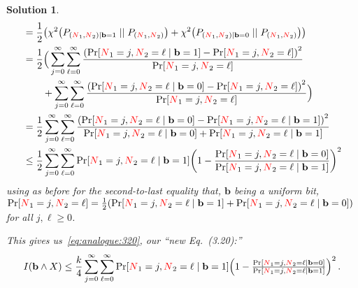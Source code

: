 \documentclass[biber,plain]{nowfnt} %
\newtheorem{solution}{Solution}[chapter]
\newcommand{\occur}{\textcolor{red}{N}}
\newcommand{\occur}{N}
\begin{document}
\begin{solution}
\begin{align*}
	&= \frac{1}{2}\Paren{\chisquare{P_{(\occur_1,\occur_2)\mid \mathbf{b}=\accept}}{P_{(\occur_1,\occur_2)}} + \chisquare{P_{(\occur_1,\occur_2)\mid \mathbf{b}=\reject}}{P_{(\occur_1,\occur_2)}}}\notag\\
	&= \frac{1}{2}\Big(\sum_{j=0}^\infty\sum_{\ell=0}^\infty \frac{\Paren{\bPr{\occur_1=j, \occur_2 = \ell\mid \mathbf{b}=\accept }-\bPr{\occur_1=j, \occur_2 = \ell }}^2}{\bPr{\occur_1=j, \occur_2 = \ell}}  \notag\\
	&\qquad+ \sum_{j=0}^\infty\sum_{\ell=0}^\infty \frac{\Paren{\bPr{\occur_1=j, \occur_2 = \ell\mid \mathbf{b}=\reject }-\bPr{\occur_1=j, \occur_2 = \ell }}^2}{\bPr{\occur_1=j, \occur_2 = \ell}} \Big) \notag\\
	&=\frac{1}{2} \sum_{j=0}^\infty\sum_{\ell=0}^\infty \frac{\Paren{\bPr{\occur_1=j, \occur_2 = \ell\mid \mathbf{b}=\reject }-\bPr{\occur_1=j, \occur_2 = \ell\mid \mathbf{b}=\accept }}^2}{\bPr{\occur_1=j, \occur_2 = \ell\mid \mathbf{b}=\reject }+\bPr{\occur_1=j, \occur_2 = \ell\mid \mathbf{b}=\accept }} \notag\\
	&\leq \frac{1}{2} \sum_{j=0}^\infty\sum_{\ell=0}^\infty \bPr{\occur_1=j, \occur_2 = \ell\mid \mathbf{b}=\accept }\Paren{1-  \frac{\bPr{\occur_1=j, \occur_2 = \ell\mid \mathbf{b}=\reject }}{\bPr{\occur_1=j, \occur_2 = \ell\mid \mathbf{b}=\accept }}  }^2
\end{align*}
using as before for the second-to-last equality that, $\mathbf{b}$ being a uniform bit, $\bPr{\occur_1=j, \occur_2 = \ell} = \frac{1}{2}( \bPr{\occur_1=j, \occur_2 = \ell\mid \mathbf{b}=\accept }+ \bPr{\occur_1=j, \occur_2 = \ell\mid \mathbf{b}=\reject })$ for all $j, \ell\geq 0$.

This gives us~\cref{eq:analogue:320}, our ``new Eq.~(3.20):''
\begin{equation}
	\label{eq:analogue:320}
	\mutualinfo{\mathbf{b}}{X} \leq \frac{\ab}{4} \sum_{j=0}^\infty\sum_{\ell=0}^\infty \bPr{\occur_1=j, \occur_2 = \ell\mid \mathbf{b}=\accept }\Paren{1-  \tfrac{\bPr{\occur_1=j, \occur_2 = \ell\mid \mathbf{b}=\reject }}{\bPr{\occur_1=j, \occur_2 = \ell\mid \mathbf{b}=\accept }}  }^2\,.
\end{equation}


\end{solution}
\end{document}
